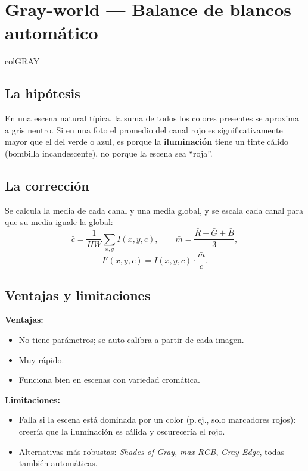 \documentclass[11pt,a4paper]{article}
\begin{document}
\section{\textcolor{colGRAY}{Gray-world} — Balance de blancos automático}
\begin{keybox}{colGRAY}

\subsection*{La hipótesis}

En una escena natural típica, la suma de todos los colores presentes se
aproxima a gris neutro. Si en una foto el promedio del canal rojo es
significativamente mayor que el del verde o azul, es porque la
\textbf{iluminación} tiene un tinte cálido (bombilla incandescente), no
porque la escena sea ``roja''.

\subsection*{La corrección}

Se calcula la media de cada canal y una media global, y se escala cada canal
para que su media iguale la global:
\begin{equation}
    \bar{c} = \frac{1}{HW}\sum_{x,y} I(x,y,c), \qquad
    \bar{m} = \frac{\bar{R} + \bar{G} + \bar{B}}{3},
\end{equation}
\begin{equation}
    I'(x,y,c) = I(x,y,c) \cdot \frac{\bar{m}}{\bar{c}}.
\end{equation}

\subsection*{Ventajas y limitaciones}

\textbf{Ventajas:}
\begin{itemize}
    \item No tiene parámetros; se auto-calibra a partir de cada imagen.
    \item Muy rápido.
    \item Funciona bien en escenas con variedad cromática.
\end{itemize}

\textbf{Limitaciones:}
\begin{itemize}
    \item Falla si la escena está dominada por un color (p.\,ej., solo
          marcadores rojos): creería que la iluminación es cálida y
          oscurecería el rojo.
    \item Alternativas más robustas: \emph{Shades of Gray}, \emph{max-RGB},
          \emph{Gray-Edge}, todas también automáticas.
\end{itemize}

\end{keybox}
\end{document}

